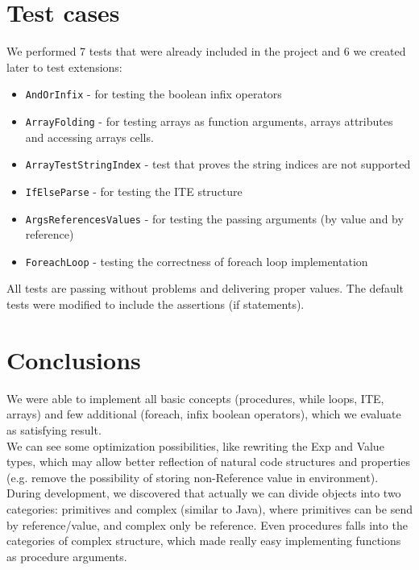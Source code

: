 \documentclass[10pt]{scrartcl}
\begin{document}
\section{Test cases}
We performed 7 tests that were already included in the project and 6 we created later to test extensions:
\begin{itemize}
\item \texttt{AndOrInfix} - for testing the boolean infix operators
\item \texttt{ArrayFolding} - for testing arrays as function arguments, arrays attributes and accessing arrays cells.
\item \texttt{ArrayTestStringIndex} - test that proves the string indices are not supported
\item \texttt{IfElseParse} - for testing the ITE structure
\item \texttt{ArgsReferencesValues} - for testing the passing arguments (by value and by reference)
\item \texttt{ForeachLoop} - testing the correctness of foreach loop implementation
\end{itemize}
All tests are passing without problems and delivering proper values. 
The default tests were modified to include the assertions (if statements).

\section{Conclusions}
We were able to implement all basic concepts (procedures, while loops, ITE, arrays) and few additional (foreach, infix boolean operators), which we evaluate as satisfying result. \\
We can see some optimization possibilities, like rewriting the Exp and Value types, which may allow better reflection of natural code structures and properties (e.g. remove the possibility of storing non-Reference value in environment). \\
During development, we discovered that actually we can divide objects into two categories: primitives and complex (similar to Java), where primitives can be send by reference/value, and complex only be reference. Even procedures falls into the categories of complex structure, which made really easy implementing functions as procedure arguments. 
\end{document}
